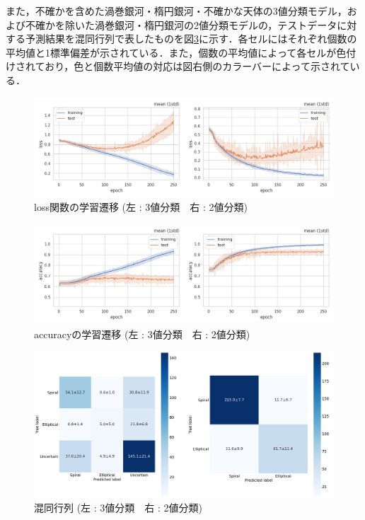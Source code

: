 \documentclass[a4j, 11pt]{jreport}
\begin{document}
また，不確かを含めた渦巻銀河・楕円銀河・不確かな天体の3値分類モデル，および不確かを除いた渦巻銀河・楕円銀河の2値分類モデルの，テストデータに対する予測結果を混同行列で表したものを図\ref{fig:4_2_cms}に示す．各セルにはそれぞれ個数の平均値と1標準偏差が示されている．また，個数の平均値によって各セルが色付けされており，色と個数平均値の対応は図右側のカラーバーによって示されている．


\begin{figure}[H]
 \centering
 \includegraphics[width=1\hsize, keepaspectratio]{images/drawio/4_2_losses.png}
 \caption{loss関数の学習遷移 (左 : 3値分類　右 : 2値分類)}
 \label{fig:4_2_losses}
\end{figure}

\begin{figure}[H]
  \centering
  \includegraphics[width=1\hsize, keepaspectratio]{images/drawio/4_2_accs.png}
  \caption{accuracyの学習遷移 (左 : 3値分類　右 : 2値分類)}
  \label{fig:4_2_accs}
\end{figure}

\begin{figure}[H]
  \centering
  \includegraphics[width=1\hsize, keepaspectratio]{images/drawio/4_2_cms.png}
  \caption{混同行列 (左 : 3値分類　右 : 2値分類)}
  \label{fig:4_2_cms}
\end{figure}
\end{document}
